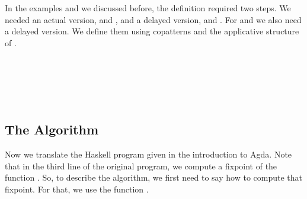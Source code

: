 In the examples  and  we discussed before, the definition required two steps.
We needed an actual version,  and , and a delayed version,  and .
For  and  we also need a delayed version.
We define them using copatterns and the applicative structure of .

\begin{code}%
\>[0]\AgdaSpace{}%
\AgdaSymbol{:}\AgdaSpace{}%
\AgdaFunction{\&}\AgdaSymbol{(}\AgdaSpace{}%
\AgdaSpace{}%
\AgdaSpace{}%
\AgdaSpace{}%
\AgdaSymbol{)}\<%
\\
\>[0]\AgdaSpace{}%
\AgdaSymbol{(}\AgdaSpace{}%
\AgdaSymbol{)}\AgdaSpace{}%
\AgdaSymbol{=}\AgdaSpace{}%
\AgdaSpace{}%
\AgdaSymbol{(}\AgdaSpace{}%
\AgdaSymbol{)}\<%
\\
%
\\[\AgdaEmptyExtraSkip]%
\>[0]\AgdaSpace{}%
\AgdaSymbol{:}\AgdaSpace{}%
\AgdaFunction{\&}\AgdaSymbol{(}\AgdaSpace{}%
\AgdaSpace{}%
\AgdaSpace{}%
\AgdaSpace{}%
\AgdaSpace{}%
\AgdaSpace{}%
\AgdaSpace{}%
\AgdaSymbol{)}\<%
\\
\>[0]\AgdaSpace{}%
\AgdaSpace{}%
\AgdaSpace{}%
\AgdaSymbol{=}\AgdaSpace{}%
\AgdaSpace{}%
\AgdaSpace{}%
\AgdaSpace{}%
\AgdaSpace{}%
\AgdaSpace{}%
\<%
\end{code}

\subsection{The Algorithm}
Now we translate the Haskell program given in the introduction to Agda.
Note that in the third line of the original program, we compute a fixpoint of the function .
So, to describe the algorithm, we first need to say how to compute that fixpoint.
For that, we use the function .

